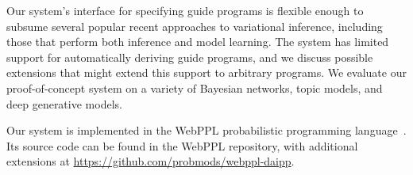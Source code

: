 Our system's interface for specifying guide programs is flexible enough to subsume several popular recent approaches to variational inference, including those that perform both inference and model learning.
The system has limited support for automatically deriving guide programs, and we discuss possible extensions that might extend this support to arbitrary programs.
We evaluate our proof-of-concept system on a variety of Bayesian networks, topic models, and deep generative models.

Our system is implemented in the WebPPL probabilistic programming language~\cite{WebPPL}. Its source code can be found in the WebPPL repository, with additional extensions at \url{https://github.com/probmods/webppl-daipp}.